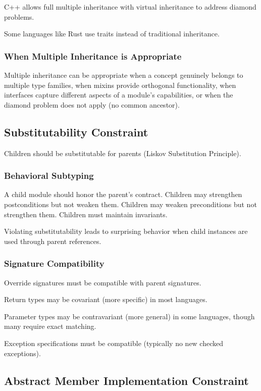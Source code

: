 \documentclass[11pt]{article}
\begin{document}
C++ allows full multiple inheritance with virtual inheritance to address diamond problems.

Some languages like Rust use traits instead of traditional inheritance.

\subsubsection{When Multiple Inheritance is Appropriate}

Multiple inheritance can be appropriate when a concept genuinely belongs to multiple type families, when mixins provide orthogonal functionality, when interfaces capture different aspects of a module's capabilities, or when the diamond problem does not apply (no common ancestor).

\subsection{Substitutability Constraint}

Children should be substitutable for parents (Liskov Substitution Principle).

\subsubsection{Behavioral Subtyping}

A child module should honor the parent's contract. Children may strengthen postconditions but not weaken them. Children may weaken preconditions but not strengthen them. Children must maintain invariants.

Violating substitutability leads to surprising behavior when child instances are used through parent references.

\subsubsection{Signature Compatibility}

Override signatures must be compatible with parent signatures.

Return types may be covariant (more specific) in most languages.

Parameter types may be contravariant (more general) in some languages, though many require exact matching.

Exception specifications must be compatible (typically no new checked exceptions).

\subsection{Abstract Member Implementation Constraint}
\end{document}
